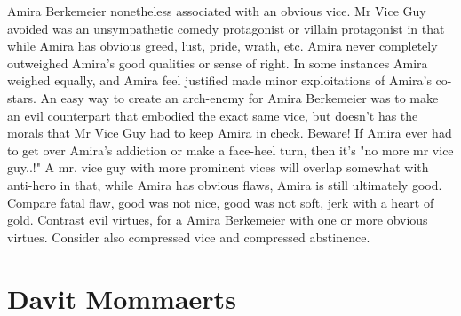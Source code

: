 \documentclass[12pt]{book}
\begin{document}
Amira Berkemeier nonetheless associated with an obvious vice. Mr Vice Guy avoided was an unsympathetic comedy protagonist or villain protagonist in that while Amira has obvious greed, lust, pride, wrath, etc. Amira never completely outweighed Amira's good qualities or sense of right. In some instances Amira weighed equally, and Amira feel justified made minor exploitations of Amira's co-stars. An easy way to create an arch-enemy for Amira Berkemeier was to make an evil counterpart that embodied the exact same vice, but doesn't has the morals that Mr Vice Guy had to keep Amira in check. Beware! If Amira ever had to get over Amira's addiction or make a face-heel turn, then it's "no more mr vice guy..!" A mr. vice guy with more prominent vices will overlap somewhat with anti-hero in that, while Amira has obvious flaws, Amira is still ultimately good. Compare fatal flaw, good was not nice, good was not soft, jerk with a heart of gold. Contrast evil virtues, for a Amira Berkemeier with one or more obvious virtues. Consider also compressed vice and compressed abstinence.



\chapter{Davit Mommaerts}
\end{document}

